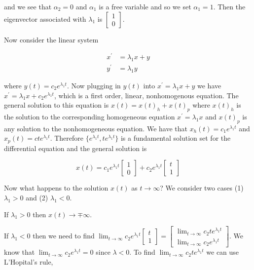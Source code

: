 \documentclass[12pt]{article}
\theoremstyle{definition}
\begin{document}
and we see that $\alpha_2 = 0$ and $\alpha_1$ is a free variable and so we set $\alpha_1 = 1$. Then the eigenvector associated with $\lambda_1$ is $\begin{bmatrix} 1 \\ 0 \end{bmatrix}$.

Now consider the linear system

\begin{equation*}
\begin{split}
x^{\prime} &= \lambda_1 x + y \\
y^{\prime} &= \lambda_1 y
\end{split}
\end{equation*}

where $y(t) = c_2 e^{\lambda_1 t}$. Now plugging in $y(t)$ into $x^{\prime} = \lambda_1 x + y$ we have $x^{\prime} = \lambda_1 x + c_2 e^{\lambda_1 t}$, which is a first order, linear, nonhomogenous equation. The general solution to this equation is $x(t) = x(t)_h + x(t)_p$ where $x(t)_h$ is the solution to the corresponding homogeneous equation $x^{\prime} = \lambda_1 x$ and $x(t)_p$ is any solution to the nonhomogeneous equation. We have that $x_h(t) = c_1 e^{\lambda_1 t}$ and $x_p(t) = cte^{\lambda_1 t}$. Therefore $\{e^{\lambda_1 t}, te^{\lambda_1 t} \}$ is a fundamental solution set for the differential equation and the general solution is

\begin{equation*}
x(t) = c_1 e^{\lambda_1 t}
\begin{bmatrix}
1 \\
0
\end{bmatrix}
+
c_2 e^{\lambda_1 t}
\begin{bmatrix}
t \\
1
\end{bmatrix}
\end{equation*}

Now what happens to the solution $x(t)$ as $t \rightarrow \infty$? We consider two cases (1) $\lambda_1 > 0$ and (2) $\lambda_1 < 0$.

If $\lambda_1 > 0$ then $x(t) \rightarrow \mp \infty$.

If $\lambda_1 < 0$ then we need to find $\lim_{t \rightarrow \infty} c_2 e^{\lambda_1 t} \begin{bmatrix} t \\ 1 \end{bmatrix} = \begin{bmatrix}  \lim_{t \rightarrow \infty} c_2 t e^{\lambda_1 t} \\ \lim_{t \rightarrow \infty} c_2 e^{\lambda_1 t}  \end{bmatrix}$. We know that $\lim_{t \rightarrow \infty} c_2 e^{\lambda_1 t} = 0$ since $\lambda < 0$. To find $\lim_{t \rightarrow \infty} c_2 t e^{\lambda_1 t}$ we can use L'Hopital's rule,
\end{document}
